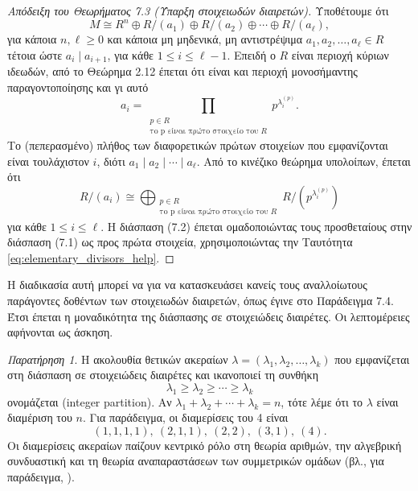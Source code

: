 \documentclass[12pt,a4paper,reqno]{amsart}
\theoremstyle{definition}
\theoremstyle{remark}
\newtheorem*{remark}{Παρατήρηση}
\numberwithin{theorem}{section}
\numberwithin{exercise}{section}
\numberwithin{equation}{section}
\newcommand{\defn}[1]{{\color{mylightblue}{#1}}}
\begin{document}
\begin{proof}[Απόδειξη του Θεωρήματος 7.3 (Ύπαρξη στοιχειωδών διαιρετών)]
    Υποθέτουμε ότι 
    \[
    M \cong R^n \oplus R/(a_1) \oplus R/(a_2) \oplus \cdots \oplus R/(a_\ell),
    \]
για κάποια $n, \ell \ge 0$ και κάποια μη μηδενικά, μη αντιστρέψιμα $a_1, a_2, \dots, a_\ell \in R$ τέτοια ώστε $a_i \mid a_{i+1}$, για κάθε $1 \le i \le \ell-1$. Επειδή ο $R$ είναι περιοχή κύριων ιδεωδών, από το Θεώρημα 2.12 έπεται ότι είναι και περιοχή μονοσήμαντης παραγοντοποίησης και γι αυτό 
\[
a_i = \prod_{\substack{p \in R \\ \text{το p είναι πρώτο στοιχείο του $R$}}} p^{\lambda_i^{(p)}}.
\]
Το (πεπερασμένο) πλήθος των διαφορετικών πρώτων στοιχείων που εμφανίζονται είναι τουλά\-χιστον $i$, διότι $a_1 \mid a_2 \mid \cdots \mid a_\ell$. Από το κινέζικο θεώρημα υπολοίπων, έπεται ότι 
\begin{equation}
    \label{eq:elementary_divisors_help}
    R/(a_i) \cong \bigoplus_{\substack{p \in R \\ \text{το p είναι πρώτο στοιχείο του $R$}}} R/(p^{\lambda_i^{(p)}})
\end{equation}
για κάθε $1 \le i \le \ell$. Η διάσπαση (7.2) έπεται ομαδοποιώντας τους προσθεταίους στην διάσπαση (7.1) ως προς πρώτα στοιχεία, χρησιμοποιώντας την Ταυτότητα \eqref{eq:elementary_divisors_help}.
\end{proof}

Η διαδικασία αυτή μπορεί να  για να κατασκευάσει κανείς τους αναλλοίωτους παράγοντες δοθέντων των στοιχειωδών διαιρετών, όπως έγινε στο Παράδειγμα 7.4. Έτσι έπεται η μοναδικότητα της διάσπασης σε στοιχειώδεις διαιρέτες. Οι λεπτομέρειες αφήνονται ως άσκηση.

\begin{remark}
    Η ακολουθία θετικών ακεραίων $\lambda = (\lambda_1,\lambda_2, \dots, \lambda_k)$ που εμφανίζεται στη διάσπαση σε στοιχειώδεις διαιρέτες και ικανοποιεί τη συνθήκη 
    \[
    \lambda_1 \ge \lambda_2 \ge \cdots \ge \lambda_k
    \]
    ονομάζεται \defn{διαμέριση ακεραίου} (integer partition). Αν $\lambda_1 + \lambda_2 + \cdots + \lambda_k = n$, τότε λέμε ότι το $\lambda$ είναι διαμέριση του $n$. Για παράδειγμα, οι διαμερίσεις του 4 είναι 
    \[
    (1,1,1,1), \ (2,1,1), \ (2,2), \ (3,1), \ (4).
    \]
    Οι διαμερίσεις ακεραίων παίζουν κεντρικό ρόλο στη θεωρία αριθμών, την αλγεβρική συνδυαστική και τη θεωρία αναπαραστάσεων των συμμετρικών ομάδων (βλ., για παράδειγμα, \cite[Ενότητα~6]{StaAC}).
\end{remark}
\end{document}
